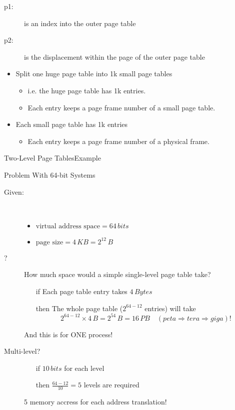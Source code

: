 \begin{description}
\item[p1:] is an index into the outer page table
\item[p2:] is the displacement within the page of the outer page table
\end{description}

\begin{itemize}
\item Split one huge page table into 1k small page tables
  \begin{itemize}
  \item i.e. the huge page table has 1k entries.
  \item Each entry keeps a page frame number of a small page table.
  \end{itemize}
\item Each small page table has 1k entries
  \begin{itemize}
  \item Each entry keeps a page frame number of a physical frame.
  \end{itemize}
\end{itemize}

\begin{frame}{Two-Level Page Tables}{Example}
  \centering
  \mode<beamer>{ \texttt{[image: 2-level-paging-2]} }%
\end{frame}

\begin{frame}{Problem With 64-bit Systems}
  \begin{description}
  \item[Given:]\hfill\\[-2ex]
    \begin{itemize}
    \item $\text{virtual address space} = 64\,bits$
    \item $\text{page size}=4\,KB=2^{12}\,B$
    \end{itemize}
  \item[?] How much space would a simple single-level page table take?
    \begin{itemize}
    \item[if] Each page table entry takes $4\,Bytes$
    \item[then] The whole page table ($2^{64-12}$ entries) will take
      \[2^{64-12}\times{}4\,B=2^{54}\,B=16\,PB \quad {\scriptstyle(peta \Rightarrow tera \Rightarrow giga)!}\]
    \end{itemize}
    And this is for ONE process!
  \item[Multi-level?]\hfill
    \begin{itemize}
    \item[if] $10\,bits$ for each level
    \item[then] $\frac{64-12}{10}=5$ levels are required
    \end{itemize}
    5 memory accress for each address translation!
  \end{description}
\end{frame}

